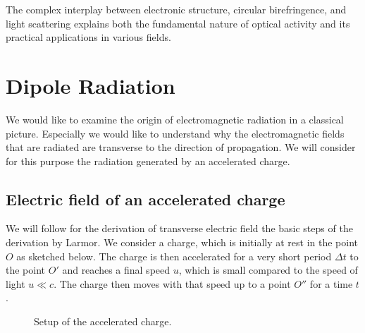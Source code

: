 \documentclass[
  a4paper,
]{book}
\begin{document}
The complex interplay between electronic structure, circular
birefringence, and light scattering explains both the fundamental nature
of optical activity and its practical applications in various fields.

\chapter{Dipole Radiation}\label{dipole-radiation}

We would like to examine the origin of electromagnetic radiation in a
classical picture. Especially we would like to understand why the
electromagnetic fields that are radiated are transverse to the direction
of propagation. We will consider for this purpose the radiation
generated by an accelerated charge.

\section{Electric field of an accelerated
charge}\label{electric-field-of-an-accelerated-charge}

We will follow for the derivation of transverse electric field the basic
steps of the derivation by Larmor. We consider a charge, which is
initially at rest in the point \(O\) as sketched below. The charge is
then accelerated for a very short period \(\Delta t\) to the point
\(O'\) and reaches a final speed \(u\), which is small compared to the
speed of light \(u \ll c\). The charge then moves with that speed up to
a point \(O''\) for a time \(t\).

\begin{figure}


\caption{\label{fig-dipole-radiation}Setup of the accelerated charge.}

\end{figure}%
\end{document}
